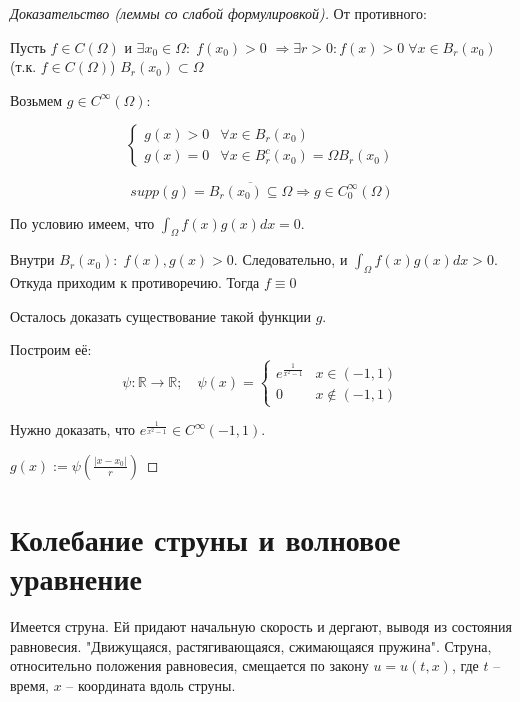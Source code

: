 \documentclass[12pt]{report}
\begin{document}
\begin{proof}[Доказательство (леммы со слабой формулировкой)]
    От противного: 
    
    Пусть $f \in C(\Omega)$ и $\exists x_0 \in \Omega \colon \; f(x_0) > 0$ $\Longrightarrow \exists r>0 \colon f(x) > 0 \; \forall x \in B_r(x_0)$ (т.к. $f \in C(\Omega)$) $B_r(x_0) \subset \Omega$
    
    Возьмем $g \in C^\infty(\Omega) \colon $
    
    $$
        \begin{cases}
            g(x) > 0 & \forall x \in B_r(x_0)
            \\
            g(x) = 0 & \forall x \in B_r^c(x_0) = \Omega  B_r(x_0)
        \end{cases}
    $$
    
    $$supp(g) = \overline{B_r(x_0) \subseteq \Omega} \Longrightarrow g \in C_0^\infty(\Omega)$$
    
    По условию имеем, что $\int_{\Omega}{f(x)g(x)dx} = 0$.
    
    Внутри $B_r(x_0) \colon \; f(x), g(x) > 0$. Следовательно, и $\int_{\Omega}{f(x)g(x)dx} > 0$. Откуда приходим к противоречию. Тогда $f \equiv 0$
    
    Осталось доказать существование такой функции $g$. 
    
    Построим её: 
    $$\psi \colon \mathbb{R} \longrightarrow \mathbb{R}; \quad 
        \psi(x) = 
        \begin{cases}
            e^{\frac{1}{x^2 - 1}} & x \in (-1, 1)
            \\
            0 & x \notin (-1, 1)
        \end{cases}
    $$
    
    Нужно доказать, что $e^{\frac{1}{x^2 - 1}} \in C^\infty (-1, 1)$.
    
    $g(x) := \psi(\frac{|x-x_0|}{r})$
    
\end{proof}
    
\section{Колебание струны и волновое уравнение}
Имеется струна. Ей придают начальную скорость и дергают, выводя из состояния равновесия. "Движущаяся, растягивающаяся, сжимающаяся пружина". Струна, относительно положения равновесия, смещается по закону $u = u(t,x)$, где $t$ -- время, $x$ -- координата вдоль струны.
\end{document}
